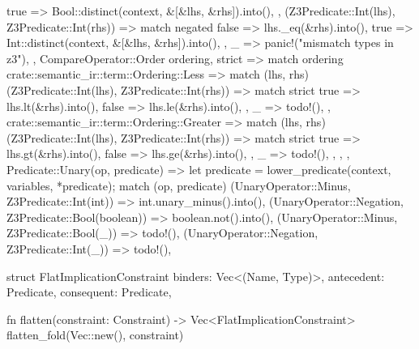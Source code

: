 \documentclass[
  oneside,
  english,
  coorientadorbanca,
  noabntexcite
]{ufsc-thesis-rn46-2019}
\begin{document}
\begin{rustcode}
{{{{{{{                            true => Bool::distinct(context, &[&lhs, &rhs]).into(),
                        },
                        (Z3Predicate::Int(lhs), Z3Predicate::Int(rhs)) => match negated {
                            false => lhs._eq(&rhs).into(),
                            true => Int::distinct(context, &[&lhs, &rhs]).into(),
                        },
                        _ => panic!("mismatch types in z3"),
                    },
                    CompareOperator::Order { ordering, strict } => match ordering {
                        crate::semantic_ir::term::Ordering::Less => match (lhs, rhs) {
                            (Z3Predicate::Int(lhs), Z3Predicate::Int(rhs)) => match strict {
                                true => lhs.lt(&rhs).into(),
                                false => lhs.le(&rhs).into(),
                            },
                            _ => todo!(),
                        },
                        crate::semantic_ir::term::Ordering::Greater => match (lhs, rhs) {
                            (Z3Predicate::Int(lhs), Z3Predicate::Int(rhs)) => match strict {
                                true => lhs.gt(&rhs).into(),
                                false => lhs.ge(&rhs).into(),
                            },
                            _ => todo!(),
                        },
                    },
                },
            }
        }
        Predicate::Unary(op, predicate) => {
            let predicate = lower_predicate(context, variables, *predicate);
            match (op, predicate) {
                (UnaryOperator::Minus, Z3Predicate::Int(int)) => int.unary_minus().into(),
                (UnaryOperator::Negation, Z3Predicate::Bool(boolean)) => boolean.not().into(),
                (UnaryOperator::Minus, Z3Predicate::Bool(_)) => todo!(),
                (UnaryOperator::Negation, Z3Predicate::Int(_)) => todo!(),
            }
        }
    }
}

struct FlatImplicationConstraint {
    binders: Vec<(Name, Type)>,
    antecedent: Predicate,
    consequent: Predicate,
}

fn flatten(constraint: Constraint) -> Vec<FlatImplicationConstraint> {
    flatten_fold(Vec::new(), constraint)
}


\end{rustcode}
\end{document}
